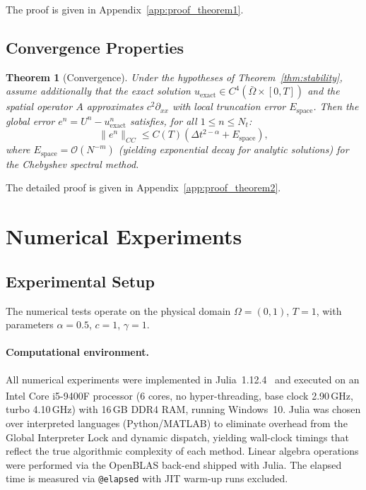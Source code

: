 \documentclass[a4paper,fleqn]{cas-sc}
\newtheorem{theorem}{Theorem}
\begin{document}
The proof is given in Appendix~\ref{app:proof_theorem1}.

\subsection{Convergence Properties}

\begin{theorem}[Convergence]\label{thm:convergence}
Under the hypotheses of Theorem~\ref{thm:stability}, assume additionally that the exact solution $u_{\mathrm{exact}} \in C^4(\bar\Omega\times[0,T])$ and the spatial operator $A$ approximates $c^2\partial_{xx}$ with local truncation error $E_{\mathrm{space}}$. Then the global error $e^n = U^n - u_{\mathrm{exact}}^n$ satisfies, for all $1 \le n \le N_t$:
\begin{equation}\label{eq:convergence_result}
    \|e^n\|_{CC} \le C(T)\left( \Delta t^{2-\alpha} + E_{\mathrm{space}} \right),
\end{equation}
where $E_{\mathrm{space}} = \mathcal{O}(N^{-m})$ (yielding exponential decay for analytic solutions) for the Chebyshev spectral method.
\end{theorem}

The detailed proof is given in Appendix~\ref{app:proof_theorem2}.
\section{Numerical Experiments}\label{sec:experiments}

\subsection{Experimental Setup}

The numerical tests operate on the physical domain $\Omega = (0,1)$, $T=1$, with parameters $\alpha = 0.5$, $c = 1$, $\gamma = 1$.

\paragraph{Computational environment.}
All numerical experiments were implemented in Julia~1.12.4~\cite{bezanson2017julia} and executed on an Intel\textsuperscript{\textregistered} Core\texttrademark{} i5-9400F processor (6 cores, no hyper-threading, base clock 2.90\,GHz, turbo 4.10\,GHz) with 16\,GB DDR4 RAM, running Windows~10. Julia was chosen over interpreted languages (Python/MATLAB) to eliminate overhead from the Global Interpreter Lock and dynamic dispatch, yielding wall-clock timings that reflect the true algorithmic complexity of each method. Linear algebra operations were performed via the OpenBLAS back-end shipped with Julia. The elapsed time is measured via \texttt{@elapsed} with JIT warm-up runs excluded.
\end{document}
